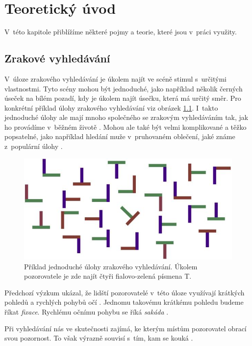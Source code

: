 \chapter{Teoretický úvod}

V~této kapitole přiblížíme některé pojmy a teorie, které jsou v~práci využity.

\section{Zrakové vyhledávání}

V~úloze zrakového vyhledávání je úkolem najít ve scéně stimul s~určitými
vlastnostmi. Tyto scény mohou být jednoduché, jako například několik černých
úseček na bílém pozadí, kdy je úkolem najít úsečku, která má určitý směr. Pro
konkrétní příklad úlohy zrakového vyhledávání viz obrázek \ref{obr:tecka}.
I~takto jednoduché úlohy ale mají mnoho společného se zrakovým vyhledáváním tak,
jak ho provádíme v~běžném životě \citep{VisualSearch}. Mohou ale také být velmi
komplikované a těžko popsatelné, jako například hledání muže v~pruhovaném
oblečení, jaké známe z~populární úlohy .  

\begin{figure}[h!]
 \includegraphics[width=.9\linewidth]{img/tecka}
  \centering
\caption{Příklad jednoduché úlohy zrakového vyhledávání. Úkolem pozorovatele je zde najít čtyři fialovo-zelená písmena T.} 
\label{obr:tecka}
\end{figure}

Předchozí výzkum ukázal, že lidští
pozorovatelé v~této úloze využívají krátkých pohledů a rychlých pohybů očí \citep{Holmquist}.
Jednomu takovému krátkému pohledu budeme říkat \emph{fixace}. Rychlému očnímu pohybu
se říká \emph{sakáda} \citep{sakady}.

Při vyhledávání nás ve skutečnosti zajímá, ke kterým místům pozorovatel obrací
svou pozornost. To však výrazně souvisí s~tím, kam se kouká \citep{Attention}.


